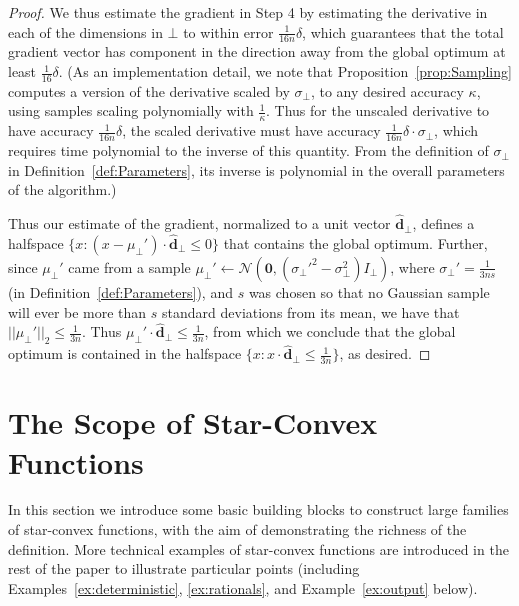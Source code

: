 \documentclass[11pt,letter]{article}
\newcommand{\from}{\leftarrow}
\newcommand{\Normal}{\mathcal{N}}
\renewcommand{\vec}[1]{\mathbf{#1}}
\newcommand{\perr}{\delta}
\newcommand{\safety}{s}
\numberwithin{nTheorems}{section}
\begin{document}
\begin{proof}
We thus estimate the gradient in Step 4 by estimating the derivative in each of the dimensions in $\bot$ to within error $\frac{1}{16n}\perr$, which guarantees that the total gradient vector has component in the direction away from the global optimum at least $\frac{1}{16}\perr$. (As an implementation detail, we note that Proposition~\ref{prop:Sampling} computes a version of the derivative scaled by $\sigma_\bot$, to any desired accuracy $\kappa$, using samples scaling polynomially with $\frac{1}{\kappa}$. Thus for the unscaled derivative to have accuracy $\frac{1}{16n}\perr$, the scaled derivative must have accuracy $\frac{1}{16n}\perr\cdot\sigma_\bot$, which requires time polynomial to the inverse of this quantity. From the definition of $\sigma_\bot$ in Definition~\ref{def:Parameters}, its inverse is polynomial in the overall parameters of the algorithm.)

Thus our estimate of the gradient, normalized to a unit vector $\hat{\vec{d}}_\bot$, defines a halfspace $\{x:(x-\mu_\bot')\cdot \hat{\vec{d}}_\bot \leq 0\}$ that contains the global optimum. Further, since $\mu_\bot'$ came from a sample $\mu_\bot'\from\Normal(\vec{0}, (\sigma_\bot'^2 - \sigma_\bot^2)I_\bot)$, where $\sigma_\bot'=\frac{1}{3n\safety}$ (in Definition~\ref{def:Parameters}), and $\safety$ was chosen so that no Gaussian sample will ever be more than $s$ standard deviations from its mean, we have that $||\mu_\bot'||_2\leq\frac{1}{3n}$. Thus $\mu_\bot'\cdot\hat{\vec{d}}_\bot\leq \frac{1}{3n}$, from which we conclude that the global optimum is contained in the halfspace $\{x:x\cdot \hat{\vec{d}}_\bot\leq \frac{1}{3n}\}$, as desired.


\end{proof}






\newpage
\appendix
\section{The Scope of Star-Convex Functions}\label{sec:examples}
In this section we introduce some basic building blocks to construct large families of star-convex functions, with the aim of demonstrating the richness of the definition. More technical examples of star-convex functions are introduced in the rest of the paper to illustrate particular points (including Examples~\ref{ex:deterministic}, \ref{ex:rationals}, and Example~\ref{ex:output} below).
\end{document}
